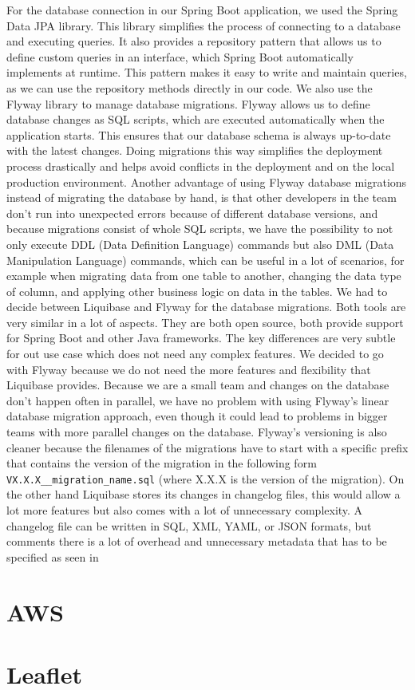 For the database connection in our Spring Boot application, we used the Spring Data JPA library. This library simplifies the process of connecting to a database and executing queries. It also provides a repository pattern that allows us to define custom queries in an interface, which Spring Boot automatically implements at runtime. This pattern makes it easy to write and maintain queries, as we can use the repository methods directly in our code. We also use the Flyway library to manage database migrations. Flyway allows us to define database changes as SQL scripts, which are executed automatically when the application starts. This ensures that our database schema is always up-to-date with the latest changes. Doing migrations this way simplifies the deployment process drastically and helps avoid conflicts in the deployment and on the local production environment. Another advantage of using Flyway database migrations instead of migrating the database by hand, is that other developers in the team don't run into unexpected errors because of different database versions, and because migrations consist of whole SQL scripts, we have the possibility to not only execute DDL (Data Definition Language) commands but also DML (Data Manipulation Language) commands, which can be useful in a lot of scenarios, for example when migrating data from one table to another, changing the data type of column, and applying other business logic on data in the tables. We had to decide between Liquibase and Flyway for the database migrations. Both tools are very similar in a lot of aspects. They are both open source, both provide support for Spring Boot and other Java frameworks. The key differences are very subtle for out use case which does not need any complex features. We decided to go with Flyway because we do not need the more features and flexibility that Liquibase provides. Because we are a small team and changes on the database don't happen often in parallel, we have no problem with using Flyway's linear database migration approach, even though it could lead to problems in bigger teams with more parallel changes on the database. Flyway's versioning is also cleaner because the filenames of the migrations have to start with a specific prefix that contains the version of the migration in the following form \texttt{VX.X.X\_\_migration\_name.sql} (where X.X.X is the version of the migration). On the other hand Liquibase stores its changes in changelog files, this would allow a lot more features but also comes with a lot of unnecessary complexity. A changelog file can be written in SQL, XML, YAML, or JSON formats, but comments there is a lot of overhead and unnecessary metadata that has to be specified as seen in 

\section{AWS}

\section{Leaflet}
